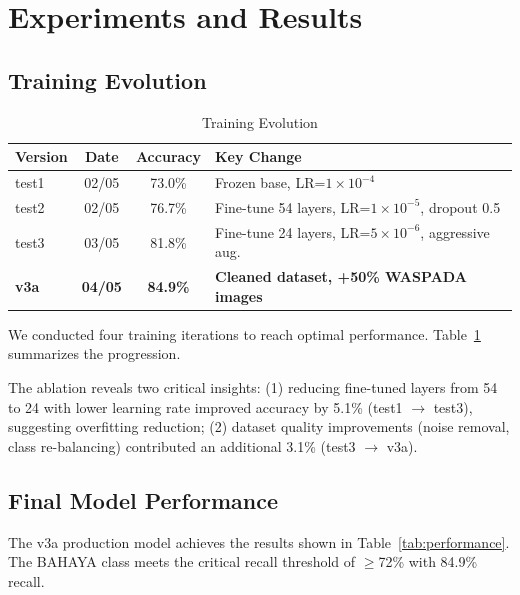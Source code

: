 \documentclass[conference]{IEEEtran}
\begin{document}
\section{Experiments and Results}

\subsection{Training Evolution}

\begin{table}[h]
	\centering
	\caption{Training Evolution}
	\label{tab:evolution}
	\small
	\begin{tabularx}{\columnwidth}{lccX}
		\toprule
		Version      & Date           & Accuracy        & Key Change                                                \\
		\midrule
		test1        & 02/05          & 73.0\%          & Frozen base, LR=$1\times10^{-4}$                          \\
		test2        & 02/05          & 76.7\%          & Fine-tune 54 layers, LR=$1\times10^{-5}$, dropout 0.5     \\
		test3        & 03/05          & 81.8\%          & Fine-tune 24 layers, LR=$5\times10^{-6}$, aggressive aug. \\
		\textbf{v3a} & \textbf{04/05} & \textbf{84.9\%} & \textbf{Cleaned dataset, +50\% WASPADA images}            \\
		\bottomrule
	\end{tabularx}
\end{table}

We conducted four training iterations to reach optimal performance. Table~\ref{tab:evolution} summarizes the progression.

The ablation reveals two critical insights: (1) reducing fine-tuned layers from 54 to 24 with lower learning rate improved accuracy by 5.1\% (test1 $\rightarrow$ test3), suggesting overfitting reduction; (2) dataset quality improvements (noise removal, class re-balancing) contributed an additional 3.1\% (test3 $\rightarrow$ v3a).

\subsection{Final Model Performance}

The v3a production model achieves the results shown in Table~\ref{tab:performance}. The BAHAYA class meets the critical recall threshold of $\geq$72\% with 84.9\% recall.
\end{document}
